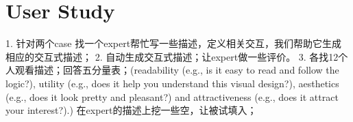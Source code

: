 \section{User Study}
1. 针对两个case 找一个expert帮忙写一些描述，定义相关交互，我们帮助它生成相应的交互式描述；
2. 自动生成交互式描述；让expert做一些评价。
3. 各找12个人观看描述；回答五分量表；(readability (e.g., is it easy to read and follow the logic?),
utility (e.g., does it help you understand this visual design?), aesthetics
(e.g., does it look pretty and pleasant?) and attractiveness (e.g., does it
attract your interest?).) 在expert的描述上挖一些空，让被试填入；